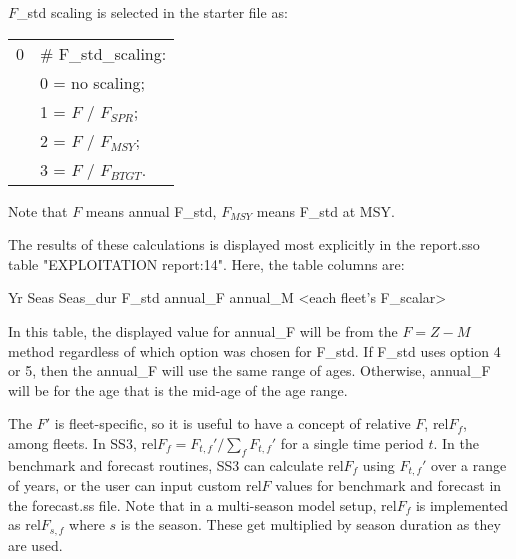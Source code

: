 $F$\_std scaling is selected in the starter file as:
\begin{center}
	\begin{longtable}{p{2cm} p{12cm}}
		\hline
		0 & \# F\_std\_scaling: \Tstrut\\
		& 0 = no scaling; \\
		& 1 = $F$ / $F_{SPR}$; \\ 
		& 2 = $F$ / $F_{MSY}$; \\
		& 3 = $F$ / $F_{BTGT}$.\Bstrut\\
		\hline
	\end{longtable}
	\vspace*{-1.7\baselineskip}
\end{center}

Note that $F$ means annual F\_std, $F_{MSY}$ means F\_std at MSY.

The results of these calculations is displayed most explicitly in the report.sso table "EXPLOITATION report:14".  Here, the table columns are:

Yr Seas Seas\_dur F\_std annual\_F annual\_M <each fleet's F\_scalar>

In this table, the displayed value for annual\_F will be from the $F=Z-M$ method regardless of which option was chosen for F\_std.  If F\_std uses option 4 or 5, then the annual\_F will use the same range of ages. Otherwise, annual\_F will be for the age that is the mid-age of the age range.



The $F'$ is fleet-specific, so it is useful to have a concept of relative $F$, $\text{rel}F_f$, among fleets. In SS3, $\text{rel}F_f= F_{t,f}'/\sum_{f}^{}F_{t,f}'$ for a single time period $t$. In the benchmark and forecast routines, SS3 can calculate $\text{rel}F_f$ using $F_{t,f}'$ over a range of years, or the user can input custom $\text{rel}F$ values for benchmark and forecast in the forecast.ss file. Note that in a multi-season model setup, $\text{rel}F_f$ is implemented as $\text{rel}F_{s,f}$ where $s$ is the season. These get multiplied by season duration as they are used.

